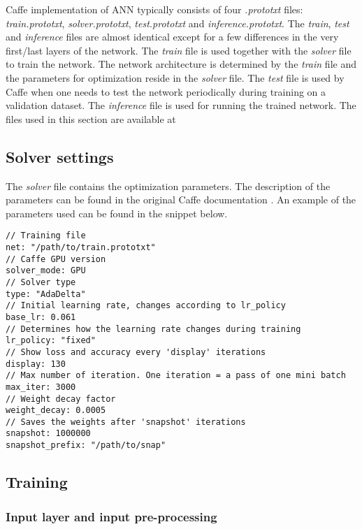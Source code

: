 Caffe implementation of ANN typically consists of four \textit{.prototxt} files: \textit{train.prototxt}, \textit{solver.prototxt}, \textit{test.prototxt} and \textit{inference.prototxt}. The \textit{train}, \textit{test} and \textit{inference} files are almost identical except for a few differences in the very first/last layers of the network. The \textit{train} file is used together with the \textit{solver} file to train the network. The network architecture is determined by the \textit{train} file and the parameters for optimization reside in the \textit{solver} file. The \textit{test} file is used by Caffe when one needs to test the network periodically during training on a validation dataset. \cite{caffe} The \textit{inference} file is used for running the trained network. The files used in this section are available at \cite{filip_github}

\subsection{Solver settings}

The \textit{solver} file contains the optimization parameters. The description of the parameters can be found in the original Caffe documentation \cite{caffe}. An example of the parameters used can be found in the snippet below. 

\begin{lstlisting}[caption={Contents of \textit{solver.prototxt} \cite{filip_github}},captionpos=b]
// Training file
net: "/path/to/train.prototxt"	
// Caffe GPU version
solver_mode: GPU
// Solver type		
type: "AdaDelta"
// Initial learning rate, changes according to lr_policy		
base_lr: 0.061		
// Determines how the learning rate changes during training
lr_policy: "fixed"	
// Show loss and accuracy every 'display' iterations
display: 130
// Max number of iteration. One iteration = a pass of one mini batch			
max_iter: 3000	
// Weight decay factor		
weight_decay: 0.0005
// Saves the weights after 'snapshot' iterations
snapshot: 1000000		
snapshot_prefix: "/path/to/snap" 
\end{lstlisting}

\subsection{Training}

\subsubsection{Input layer and input pre-processing}

